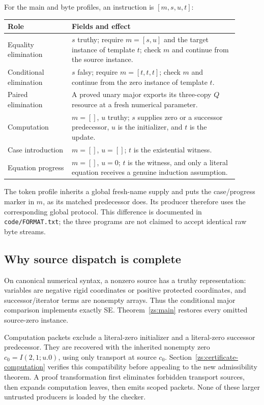 \documentclass[11pt]{article}
\theoremstyle{definition}\newtheorem{definition}[theorem]{Definition}
\theoremstyle{remark}\newtheorem{remark}[theorem]{Remark}
\newcommand{\file}[1]{\texttt{#1}}
\begin{document}
For the main and byte profiles, an instruction is $[m,s,u,t]$:
\begin{center}
\begin{tabular}{p{0.25\linewidth}p{0.65\linewidth}}
\toprule
Role & Fields and effect\\\midrule
Equality elimination & $s$ truthy; require $m=[s,u]$ and the target
instance of template $t$; check $m$ and continue from the source instance.\\
Conditional elimination & $s$ falsy; require $m=[t,t,t]$; check $m$ and
continue from the zero instance of template $t$.\\
Paired elimination & A proved unary major exports its three-copy $Q$
resource at a fresh numerical parameter.\\
Computation & $m=[]$, $u$ truthy; $s$ supplies zero or a successor
predecessor, $u$ is the initializer, and $t$ is the update.\\
Case introduction & $m=[]$, $u=[]$; $t$ is the existential witness.\\
Equation progress & $m=[]$, $u=0$; $t$ is the witness, and only a literal
equation receives a genuine induction assumption.\\\bottomrule
\end{tabular}
\end{center}
The token profile inherits a global fresh-name supply and puts the
case/progress marker in $m$, as its matched predecessor does. Its producer
therefore uses the corresponding global protocol. This difference is
documented in \file{code/FORMAT.txt}; the three programs are not claimed to
accept identical raw byte streams.

\subsection{Why source dispatch is complete}

On canonical numerical syntax, a nonzero source has a truthy representation:
variables are negative rigid coordinates or positive protected coordinates,
and successor/iterator terms are nonempty arrays. Thus the conditional
major comparison implements exactly SE. Theorem~\ref{zs:main} restores every
omitted source-zero instance.

Computation packets exclude a literal-zero initializer and a literal-zero
successor predecessor. They are recovered with the inherited nonempty zero
$c_0=I(2,1;u.0)$, using only transport at source $c_0$.
Section~\ref{zs:certificate-computation} verifies this compatibility before
appealing to the new admissibility theorem. A proof transformation first
eliminates forbidden transport sources, then expands computation leaves,
then emits scoped packets. None of these larger untrusted producers is
loaded by the checker.
\end{document}
